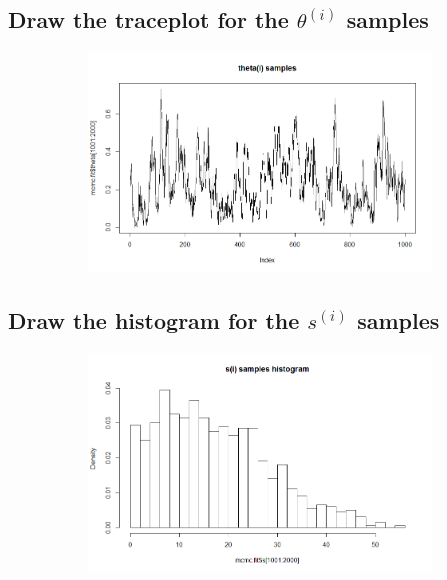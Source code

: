 \documentclass[20pt]{article} %
\begin{document}
\subsection{Draw the traceplot for the $\theta^{(i)}$ samples}
\begin{figure}[!htbp]
  	\centering
   	\begin{subfigure}[p]{0.9\linewidth}
    	\includegraphics[width=\linewidth]{./figures/hw3-02.png}
   	\end{subfigure}
\end{figure} 
\newpage
\subsection{Draw the histogram for the $s^{(i)}$ samples}
\begin{figure}[!htbp]
  	\centering
   	\begin{subfigure}[p]{0.9\linewidth}
    	\includegraphics[width=\linewidth]{./figures/hw3-03.png}
   	\end{subfigure}
\end{figure} 
\end{document}
